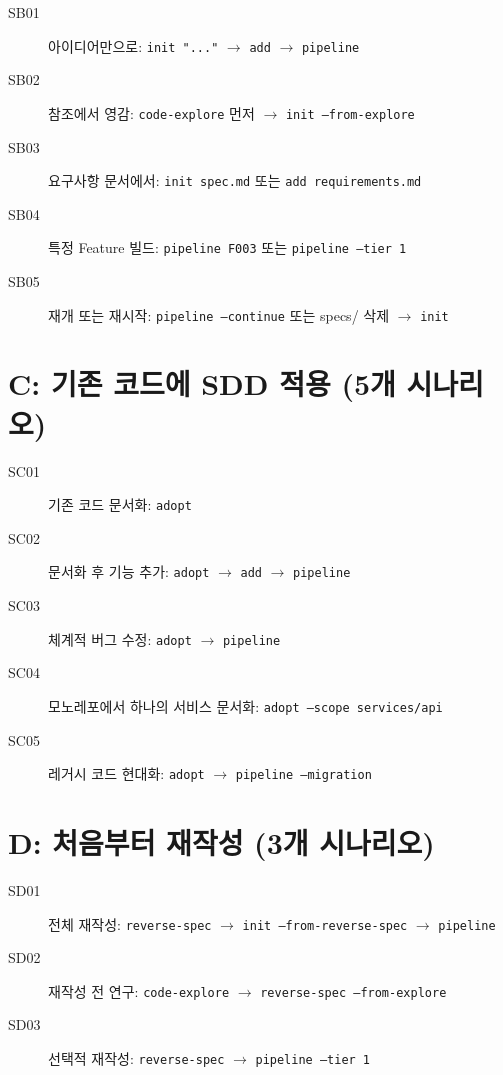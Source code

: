 \documentclass[11pt,a4paper,openright,twoside]{report}
\begin{document}
\begin{description}
  \item[SB01] 아이디어만으로: \texttt{init "..."} $\rightarrow$ \texttt{add} $\rightarrow$ \texttt{pipeline}
  \item[SB02] 참조에서 영감: \texttt{code-explore} 먼저 $\rightarrow$ \texttt{init --from-explore}
  \item[SB03] 요구사항 문서에서: \texttt{init spec.md} 또는 \texttt{add requirements.md}
  \item[SB04] 특정 Feature 빌드: \texttt{pipeline F003} 또는 \texttt{pipeline --tier 1}
  \item[SB05] 재개 또는 재시작: \texttt{pipeline --continue} 또는 specs/ 삭제 $\rightarrow$ \texttt{init}
\end{description}

\section{C: 기존 코드에 SDD 적용 (5개 시나리오)}

\begin{description}
  \item[SC01] 기존 코드 문서화: \texttt{adopt}
  \item[SC02] 문서화 후 기능 추가: \texttt{adopt} $\rightarrow$ \texttt{add} $\rightarrow$ \texttt{pipeline}
  \item[SC03] 체계적 버그 수정: \texttt{adopt} $\rightarrow$ \texttt{pipeline}
  \item[SC04] 모노레포에서 하나의 서비스 문서화: \texttt{adopt --scope services/api}
  \item[SC05] 레거시 코드 현대화: \texttt{adopt} $\rightarrow$ \texttt{pipeline --migration}
\end{description}

\section{D: 처음부터 재작성 (3개 시나리오)}

\begin{description}
  \item[SD01] 전체 재작성: \texttt{reverse-spec} $\rightarrow$ \texttt{init --from-reverse-spec} $\rightarrow$ \texttt{pipeline}
  \item[SD02] 재작성 전 연구: \texttt{code-explore} $\rightarrow$ \texttt{reverse-spec --from-explore}
  \item[SD03] 선택적 재작성: \texttt{reverse-spec} $\rightarrow$ \texttt{pipeline --tier 1}
\end{description}
\end{document}
